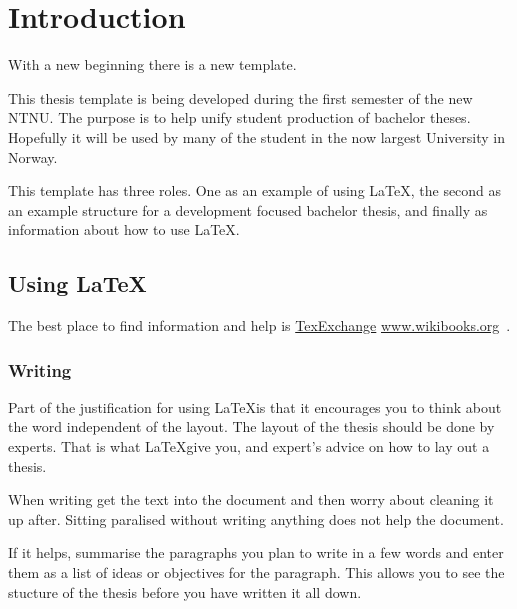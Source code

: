 \chapter{Introduction}
\label{chap:introduction}

With a new beginning there is a new template.  

This thesis template is being developed during the first semester of the new NTNU. The purpose is to help unify student production of bachelor theses.  Hopefully it will be used by many of the student in the now largest University in Norway.

This template has three roles.  One as an example of using \LaTeX, the second as an example structure for a development focused bachelor thesis, and finally as information about how to use \LaTeX.

\section{Using \LaTeX}
The best place to find information and help is \href{http://www.wikibooks.org}{TexExchange} \url{www.wikibooks.org}~\cite{texexchange}.

\subsection{Writing}
Part of the justification for using \LaTeX is that it encourages you to think about the word independent of the layout. The layout of the thesis should be done by experts. That is what \LaTeX give you, and expert's advice on how to lay out a thesis. 

When writing get the text into the document and then worry about cleaning it up after. Sitting paralised without writing anything does not help the document.  

If it helps, summarise the paragraphs you plan to write in a few words and enter them as a list of ideas or objectives for the paragraph.  This allows you to see the stucture of the thesis before you have written it all down.




  